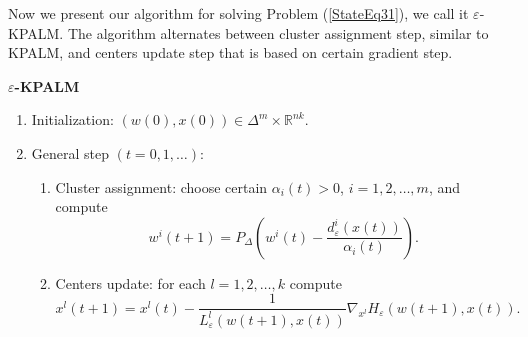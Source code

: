 \documentclass[11pt]{article}
\numberwithin{equation}{section}
\begin{document}
Now we present our algorithm for solving Problem (\ref{StateEq31}), we call it $\varepsilon$-KPALM.  The algorithm alternates between cluster assignment step, similar to  KPALM, and centers update step that is based on certain gradient step.

\newpage

\begin{framed}
\noindent \textbf{$\varepsilon$-KPALM}
\begin{enumerate}[(1)]
	\item Initialization: $(w(0),x(0)) \in \Delta^m \times \mathbb{R}^{nk} .$
	\item General step $\left( t=0,1, \ldots \right)$:
	\begin{enumerate}[(2.1)]
		\item Cluster assignment: choose certain $\alpha_i(t) > 0$, $i=1,2, \ldots, m$, and compute
		\begin{equation}
			w^i(t+1) = P_{\Delta} \left(w^i(t) - \frac{d_{\varepsilon}^i(x(t))}{\alpha_i(t)}\right) . \label{StateEq32}
		\end{equation}
		\item Centers update: for each $l=1, 2, \ldots ,k$ compute
		\begin{equation}
			x^l(t+1) = x^l(t) - \frac{1}{L^l_{\varepsilon}(w(t+1), x(t))}\nabla_{x^l} H_{\varepsilon}(w(t+1), x(t)) . \label{StateEq33}
		\end{equation}
	\end{enumerate}
\end{enumerate}
\end{framed}
\end{document}
